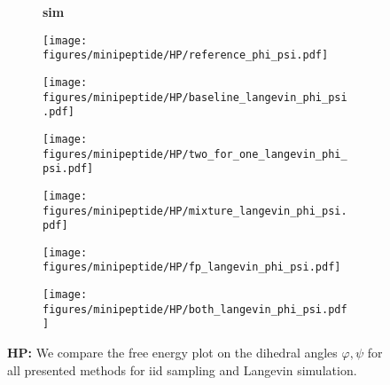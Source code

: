 \begin{figure}
    \begin{minipage}{\textwidth}
        \begin{subfigure}[c]{0.05\textwidth}
            \vspace{-0.2cm}
            \textbf{sim}
        \end{subfigure}
        \begin{subfigure}[c]{0.15\textwidth}
            \centering
            \texttt{[image: figures/minipeptide/HP/reference\_phi\_psi.pdf]}            
        \end{subfigure}
        \begin{subfigure}[c]{0.15\textwidth}
            \centering
            \texttt{[image: figures/minipeptide/HP/baseline\_langevin\_phi\_psi.pdf]}            
        \end{subfigure}
        \begin{subfigure}[c]{0.15\textwidth}
            \centering
            \texttt{[image: figures/minipeptide/HP/two\_for\_one\_langevin\_phi\_psi.pdf]}
        \end{subfigure}
        \begin{subfigure}[c]{0.15\textwidth}
            \centering
            \texttt{[image: figures/minipeptide/HP/mixture\_langevin\_phi\_psi.pdf]}
        \end{subfigure}
        \begin{subfigure}[c]{0.15\textwidth}
            \centering
            \texttt{[image: figures/minipeptide/HP/fp\_langevin\_phi\_psi.pdf]}            
        \end{subfigure}
        \begin{subfigure}[c]{0.15\textwidth}
            \centering
            \texttt{[image: figures/minipeptide/HP/both\_langevin\_phi\_psi.pdf]}            
        \end{subfigure}
    \end{minipage}
    \caption{\textbf{HP:} We compare the free energy plot on the dihedral angles $\varphi, \psi$ for all presented methods for iid sampling and Langevin simulation.}
    \label{fig:minipeptide-hp}
\end{figure}


